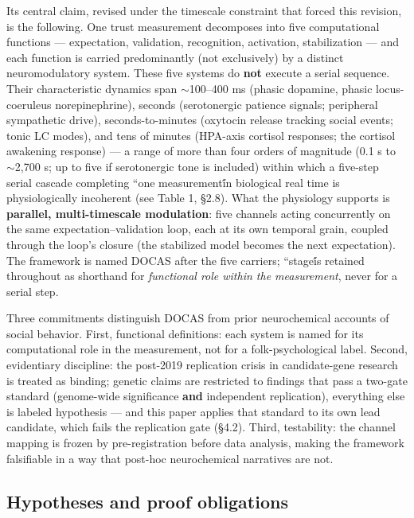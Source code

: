 \documentclass[11pt,twocolumn]{article}
\theoremstyle{plain}
\begin{document}
Its central claim, revised under the timescale constraint that forced this revision, is the following. One trust measurement decomposes into five computational functions — expectation, validation, recognition, activation, stabilization — and each function is carried predominantly (not exclusively) by a distinct neuromodulatory system. These five systems do \textbf{not} execute a serial sequence. Their characteristic dynamics span $\sim$100–400 ms (phasic dopamine, phasic locus-coeruleus norepinephrine), seconds (serotonergic patience signals; peripheral sympathetic drive), seconds-to-minutes (oxytocin release tracking social events; tonic LC modes), and tens of minutes (HPA-axis cortisol responses; the cortisol awakening response) — a range of more than four orders of magnitude (0.1 s to $\sim$2,700 s; up to five if serotonergic tone is included) within which a five-step serial cascade completing ``one measurement\'\' in biological real time is physiologically incoherent (see Table 1, \S{}2.8). What the physiology supports is \textbf{parallel, multi-timescale modulation}: five channels acting concurrently on the same expectation–validation loop, each at its own temporal grain, coupled through the loop's closure (the stabilized model becomes the next expectation). The framework is named DOCAS after the five carriers; ``stage\'\' is retained throughout as shorthand for \textit{functional role within the measurement}, never for a serial step.

Three commitments distinguish DOCAS from prior neurochemical accounts of social behavior. First, functional definitions: each system is named for its computational role in the measurement, not for a folk-psychological label. Second, evidentiary discipline: the post-2019 replication crisis in candidate-gene research \citep{border2019} is treated as binding; genetic claims are restricted to findings that pass a two-gate standard (genome-wide significance \textbf{and} independent replication), everything else is labeled hypothesis — and this paper applies that standard to its own lead candidate, which fails the replication gate (\S{}4.2). Third, testability: the channel mapping is frozen by pre-registration before data analysis, making the framework falsifiable in a way that post-hoc neurochemical narratives are not.

\subsection{Hypotheses and proof obligations}
\end{document}

